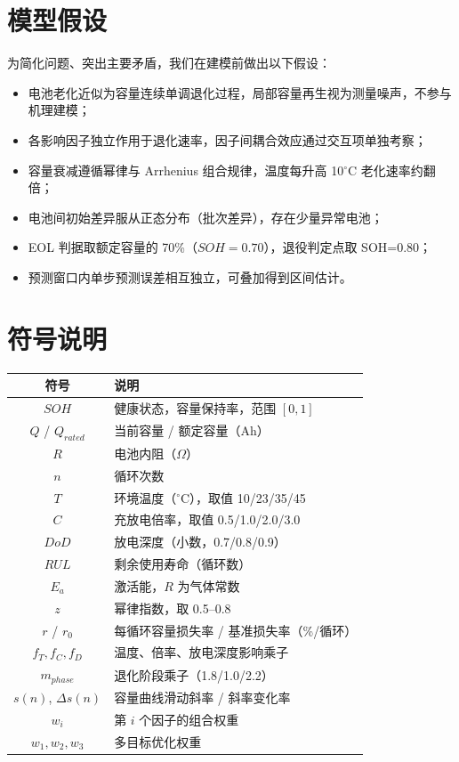 \documentclass[withoutpreface]{cumcmthesis}
\begin{document}
\section{模型假设}
为简化问题、突出主要矛盾，我们在建模前做出以下假设：
\begin{itemize}[itemindent=2em]
\item 电池老化近似为容量连续单调退化过程，局部容量再生视为测量噪声，不参与机理建模；
\item 各影响因子独立作用于退化速率，因子间耦合效应通过交互项单独考察；
\item 容量衰减遵循幂律与 Arrhenius 组合规律，温度每升高 10$^\circ$C 老化速率约翻倍；
\item 电池间初始差异服从正态分布（批次差异），存在少量异常电池；
\item EOL 判据取额定容量的 70\%（$SOH=0.70$），退役判定点取 SOH=0.80；
\item 预测窗口内单步预测误差相互独立，可叠加得到区间估计。
\end{itemize}

\section{符号说明}

\begin{table}[H]
	\centering
	\begin{tabularx}{\textwidth}{CL}
		\toprule
		符号    & 说明    \\
		\midrule
		$SOH$ & 健康状态，容量保持率，范围 $[0,1]$ \\
		$Q$ / $Q_{rated}$ & 当前容量 / 额定容量（Ah） \\
		$R$ & 电池内阻（$\Omega$） \\
		$n$ & 循环次数 \\
		$T$ & 环境温度（$^\circ$C），取值 10/23/35/45 \\
		$C$ & 充放电倍率，取值 0.5/1.0/2.0/3.0 \\
		$DoD$ & 放电深度（小数，0.7/0.8/0.9） \\
		$RUL$ & 剩余使用寿命（循环数） \\
		$E_a$ & 激活能，$R$ 为气体常数 \\
		$z$ & 幂律指数，取 0.5--0.8 \\
		$r$ / $r_0$ & 每循环容量损失率 / 基准损失率（\%/循环） \\
		$f_T,f_C,f_D$ & 温度、倍率、放电深度影响乘子 \\
		$m_{phase}$ & 退化阶段乘子（1.8/1.0/2.2） \\
		$s(n)$, $\Delta s(n)$ & 容量曲线滑动斜率 / 斜率变化率 \\
		$w_i$ & 第 $i$ 个因子的组合权重 \\
		$w_1,w_2,w_3$ & 多目标优化权重 \\
		\bottomrule
	\end{tabularx}
	\label{tab:符号说明}
\end{table}
\end{document}
